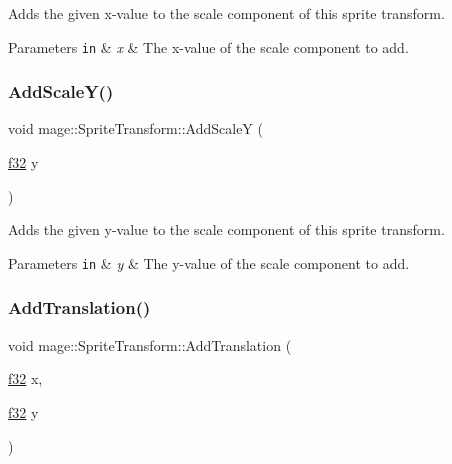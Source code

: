 Adds the given x-\/value to the scale component of this sprite transform.


\begin{DoxyParams}[1]{Parameters}
\mbox{\tt in}  & {\em x} & The x-\/value of the scale component to add. \\
\hline
\end{DoxyParams}
\hypertarget{structmage_1_1_sprite_transform_a93b60fa7983c636bc525762fca066527}{}\label{structmage_1_1_sprite_transform_a93b60fa7983c636bc525762fca066527} 
\subsubsection{\texorpdfstring{Add\+Scale\+Y()}{AddScaleY()}}
{\footnotesize\ttfamily void mage\+::\+Sprite\+Transform\+::\+Add\+ScaleY (\begin{DoxyParamCaption}\item[{\hyperlink{namespacemage_a6a44ad388483959dc4dff9f2aef91431}{f32}}]{y }\end{DoxyParamCaption})\hspace{0.3cm}{\ttfamily [noexcept]}}

Adds the given y-\/value to the scale component of this sprite transform.


\begin{DoxyParams}[1]{Parameters}
\mbox{\tt in}  & {\em y} & The y-\/value of the scale component to add. \\
\hline
\end{DoxyParams}
\hypertarget{structmage_1_1_sprite_transform_ad8ebff7e041785b13f56f74dad35d4fa}{}\label{structmage_1_1_sprite_transform_ad8ebff7e041785b13f56f74dad35d4fa} 
\subsubsection{\texorpdfstring{Add\+Translation()}{AddTranslation()}\hspace{0.1cm}{\footnotesize\ttfamily [1/3]}}
{\footnotesize\ttfamily void mage\+::\+Sprite\+Transform\+::\+Add\+Translation (\begin{DoxyParamCaption}\item[{\hyperlink{namespacemage_a6a44ad388483959dc4dff9f2aef91431}{f32}}]{x,  }\item[{\hyperlink{namespacemage_a6a44ad388483959dc4dff9f2aef91431}{f32}}]{y }\end{DoxyParamCaption})\hspace{0.3cm}{\ttfamily [noexcept]}}

